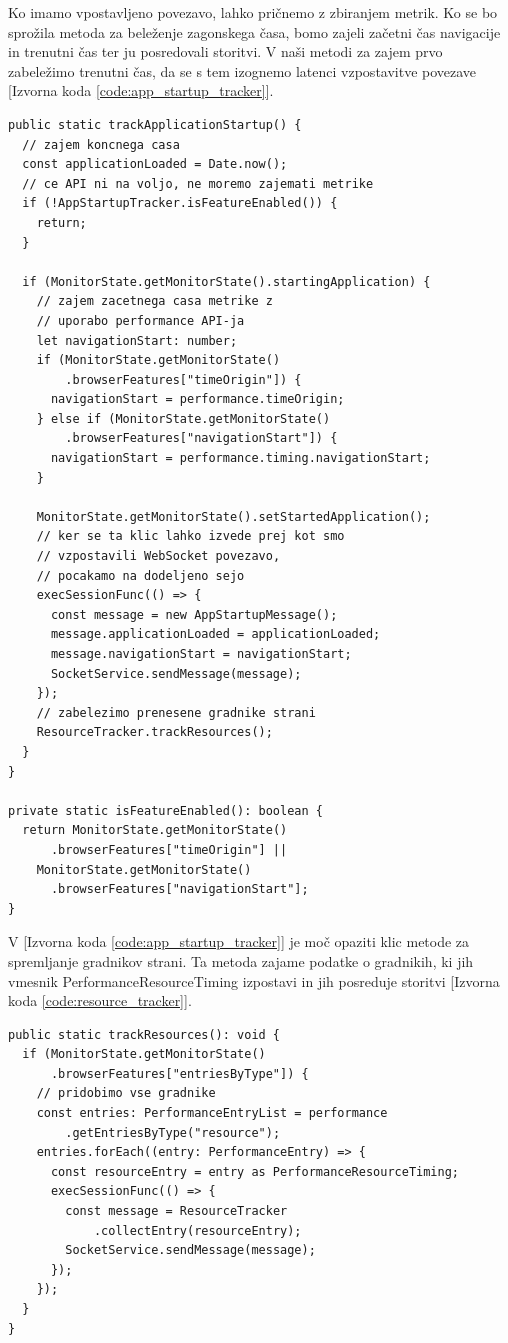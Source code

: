 \documentclass[a4paper, 12pt]{book}
\begin{document}
Ko imamo vpostavljeno povezavo, lahko pričnemo z zbiranjem metrik. Ko se bo sprožila metoda za beleženje zagonskega časa, bomo zajeli začetni čas navigacije in trenutni čas ter ju posredovali storitvi. V naši metodi za zajem prvo zabeležimo trenutni čas, da se s tem izognemo latenci vzpostavitve povezave [Izvorna koda \ref{code:app_startup_tracker}].

\begin{lstlisting}[label=code:app_startup_tracker, caption=Zajemanje zagonskega časa aplikacije]
public static trackApplicationStartup() {
  // zajem koncnega casa
  const applicationLoaded = Date.now();
  // ce API ni na voljo, ne moremo zajemati metrike
  if (!AppStartupTracker.isFeatureEnabled()) {
    return;
  }

  if (MonitorState.getMonitorState().startingApplication) {
    // zajem zacetnega casa metrike z
    // uporabo performance API-ja
    let navigationStart: number;
    if (MonitorState.getMonitorState()
        .browserFeatures["timeOrigin"]) {
      navigationStart = performance.timeOrigin;
    } else if (MonitorState.getMonitorState()
        .browserFeatures["navigationStart"]) {
      navigationStart = performance.timing.navigationStart;
    }

    MonitorState.getMonitorState().setStartedApplication();
    // ker se ta klic lahko izvede prej kot smo
    // vzpostavili WebSocket povezavo,
    // pocakamo na dodeljeno sejo
    execSessionFunc(() => {
      const message = new AppStartupMessage();
      message.applicationLoaded = applicationLoaded;
      message.navigationStart = navigationStart;
      SocketService.sendMessage(message);
    });
    // zabelezimo prenesene gradnike strani
    ResourceTracker.trackResources();
  }
}

private static isFeatureEnabled(): boolean {
  return MonitorState.getMonitorState()
      .browserFeatures["timeOrigin"] ||
    MonitorState.getMonitorState()
      .browserFeatures["navigationStart"];
}
\end{lstlisting}

V [Izvorna koda \ref{code:app_startup_tracker}] je moč opaziti klic metode za spremljanje gradnikov strani. Ta metoda zajame podatke o gradnikih, ki jih vmesnik PerformanceResourceTiming izpostavi in jih posreduje storitvi [Izvorna koda \ref{code:resource_tracker}]. 

\begin{lstlisting}[label=code:resource_tracker, caption=Zajemanje gradnikov aplikacije]
public static trackResources(): void {
  if (MonitorState.getMonitorState()
      .browserFeatures["entriesByType"]) {
    // pridobimo vse gradnike
    const entries: PerformanceEntryList = performance
        .getEntriesByType("resource");
    entries.forEach((entry: PerformanceEntry) => {
      const resourceEntry = entry as PerformanceResourceTiming;
      execSessionFunc(() => {
        const message = ResourceTracker
            .collectEntry(resourceEntry);
        SocketService.sendMessage(message);
      });
    });
  }
}
\end{lstlisting}
\end{document}
